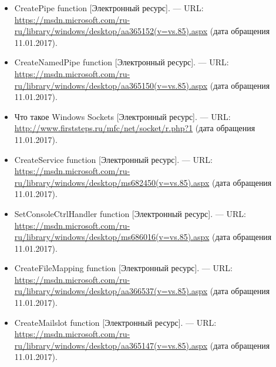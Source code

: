 \documentclass[14pt,a4paper,report]{report}
\begin{document}
\begin{itemize}
	\item CreatePipe function [Электронный ресурс]. — URL: \href{https://msdn.microsoft.com/ru-ru/library/windows/desktop/aa365152(v=vs.85).aspx}{https://msdn.microsoft.com/ru-ru/library/windows/\linebreak desktop/aa365152(v=vs.85).aspx} (дата обращения 11.01.2017).
	
	\item CreateNamedPipe function [Электронный ресурс]. — URL: \href{https://msdn.microsoft.com/ru-ru/library/windows/desktop/aa365150(v=vs.85).aspx}{https://msdn.microsoft.com/ru-ru/library/windows/\linebreak desktop/aa365150(v=vs.85).aspx} (дата обращения 11.01.2017).
	
	\item Что такое Windows Sockets [Электронный ресурс]. — URL: \href{http://www.firststeps.ru/mfc/net/socket/r.php?1}{http://www.firststeps.ru/mfc/net/socket/r.php?1} (дата обращения 11.01.2017).
	
	\item CreateService function [Электронный ресурс]. — URL: \href{https://msdn.microsoft.com/ru-ru/library/windows/desktop/ms682450(v=vs.85).aspx}{https://msdn.microsoft.com/ru-ru/library/windows/\linebreak desktop/ms682450(v=vs.85).aspx} (дата обращения 11.01.2017).
	
	\item SetConsoleCtrlHandler function [Электронный ресурс]. — URL: \href{https://msdn.microsoft.com/ru-ru/library/windows/desktop/ms686016(v=vs.85).aspx}{https://msdn.microsoft.com/ru-ru/library/windows/\linebreak desktop/ms686016(v=vs.85).aspx} (дата обращения 11.01.2017).
	
	\item CreateFileMapping function [Электронный ресурс]. — URL: \href{https://msdn.microsoft.com/ru-ru/library/windows/desktop/aa366537(v=vs.85).aspx}{https://msdn.microsoft.com/ru-ru/library/windows/\linebreak desktop/aa366537(v=vs.85).aspx} (дата обращения 11.01.2017).
	
	\item CreateMailslot function [Электронный ресурс]. — URL: \href{https://msdn.microsoft.com/ru-ru/library/windows/desktop/aa365147(v=vs.85).aspx}{https://msdn.microsoft.com/ru-ru/library/windows/\linebreak desktop/aa365147(v=vs.85).aspx} (дата обращения 11.01.2017).	
\end{itemize}
\end{document}

